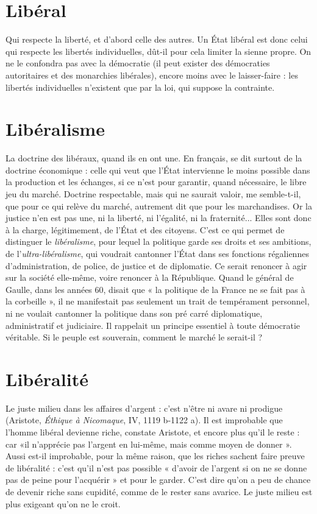 {%
\section{Libéral}
Qui respecte la liberté, et d’abord celle des autres. Un État libéral
est donc celui qui respecte les libertés individuelles, dût-il pour
cela limiter la sienne propre. On ne le confondra pas avec la démocratie (il peut
exister des démocraties autoritaires et des monarchies libérales), encore moins
avec le laisser-faire : les libertés individuelles n’existent que par la loi, qui suppose
la contrainte.

\section{Libéralisme}
La doctrine des libéraux, quand ils en ont une. En français,
se dit surtout de la doctrine économique : celle qui veut que
l'État intervienne le moins possible dans la production et les échanges, si ce
n’est pour garantir, quand nécessaire, le libre jeu du marché. Doctrine respectable,
mais qui ne saurait valoir, me semble-t-il, que pour ce qui relève du
marché, autrement dit que pour les marchandises. Or la justice n’en est pas
une, ni la liberté, ni l'égalité, ni la fraternité... Elles sont donc à la charge, légitimement,
de l’État et des citoyens. C’est ce qui permet de distinguer le {\it libéralisme},
pour lequel la politique garde ses droits et ses ambitions, de l’{\it ultra-libéralisme},
qui voudrait cantonner l’État dans ses fonctions régaliennes
d'administration, de police, de justice et de diplomatie. Ce serait renoncer à
agir sur la société elle-même, voire renoncer à la République. Quand le général
de Gaulle, dans les années 60, disait que « la politique de la France ne se fait pas
à la corbeille », il ne manifestait pas seulement un trait de tempérament personnel,
ni ne voulait cantonner la politique dans son pré carré diplomatique,
administratif et judiciaire. Il rappelait un principe essentiel à toute démocratie
véritable. Si le peuple est souverain, comment le marché le serait-il ?

\section{Libéralité}
Le juste milieu dans les affaires d’argent : c’est n'être ni avare
ni prodigue (Aristote, {\it Éthique à Nicomaque}, IV, 1119 b-1122 a).
Il est improbable que l’homme libéral devienne riche, constate Aristote, et
encore plus qu'il le reste : car «il n’apprécie pas l'argent en lui-même, mais
comme moyen de donner ». Aussi est-il improbable, pour la même raison, que
les riches sachent faire preuve de libéralité : c’est qu’il n’est pas possible
« d’avoir de l'argent si on ne se donne pas de peine pour l’acquérir » et pour le
garder. C’est dire qu’on a peu de chance de devenir riche sans cupidité, comme
de le rester sans avarice. Le juste milieu est plus exigeant qu’on ne le croit.

}
